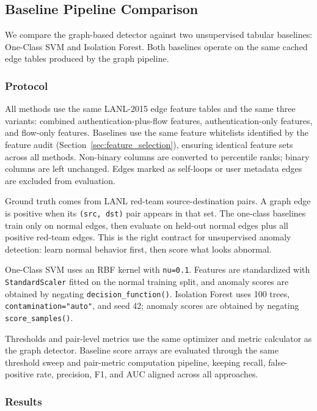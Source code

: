 \subsection{Baseline Pipeline Comparison}
\label{sec:baseline_pipeline}

We compare the graph-based detector against two unsupervised tabular baselines: One-Class SVM and Isolation Forest. Both baselines operate on the same cached edge tables produced by the graph pipeline.

\subsubsection{Protocol}

All methods use the same LANL-2015 edge feature tables and the same three variants: combined authentication-plus-flow features, authentication-only features, and flow-only features. Baselines use the same feature whitelists identified by the feature audit (Section~\ref{sec:feature_selection}), ensuring identical feature sets across all methods. Non-binary columns are converted to percentile ranks; binary columns are left unchanged. Edges marked as self-loops or user metadata edges are excluded from evaluation.

Ground truth comes from LANL red-team source-destination pairs. A graph edge is positive when its \texttt{(src, dst)} pair appears in that set. The one-class baselines train only on normal edges, then evaluate on held-out normal edges plus all positive red-team edges. This is the right contract for unsupervised anomaly detection: learn normal behavior first, then score what looks abnormal.

One-Class SVM uses an RBF kernel with \texttt{nu=0.1}. Features are standardized with \texttt{StandardScaler} fitted on the normal training split, and anomaly scores are obtained by negating \texttt{decision\_function()}. Isolation Forest uses 100 trees, \texttt{contamination="auto"}, and seed 42; anomaly scores are obtained by negating \texttt{score\_samples()}.

Thresholds and pair-level metrics use the same optimizer and metric calculator as the graph detector. Baseline score arrays are evaluated through the same threshold sweep and pair-metric computation pipeline, keeping recall, false-positive rate, precision, F1, and AUC aligned across all approaches.

\subsubsection{Results}

